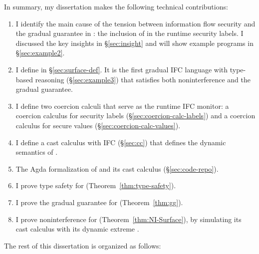 {\color{NavyBlue} %
In summary, my dissertation makes the following technical contributions:

\begin{enumerate}
\item I identify the main cause of the tension between information flow security
  and the gradual guarantee in \GSLRef: the inclusion of \unk in the runtime
  security labels. I discussed the key insights in \S\ref{sec:insight} and will
  show example programs in \S\ref{sec:example2}.
\item I define \Surface in \S\ref{sec:surface-def}. It is the first gradual IFC
  language with type-based reasoning (\S\ref{sec:example3}) that satisfies both
  noninterference and the gradual guarantee.
\item I define two coercion calculi that serve as the runtime IFC monitor: a
  coercion calculus for security labels (\S\ref{sec:coercion-calc-labels}) and a
  coercion calculus for secure values (\S\ref{sec:coercion-calc-values}).
\item I define a cast calculus \CC with IFC (\S\ref{sec:cc}) that defines the
  dynamic semantics of \Surface.
\item The Agda formalization of \Surface and its cast calculus \CC
  (\S\ref{sec:code-repo}).
\item I prove type safety for \Surface (Theorem~\ref{thm:type-safety}).
\item I prove the gradual guarantee for \Surface (Theorem~\ref{thm:gg}).
\item I prove noninterference for \Surface (Theorem~\ref{thm:NI-Surface}), by
  simulating its cast calculus \CC with its dynamic extreme \DynIFC.
\end{enumerate}

\clearpage

The rest of this dissertation is organized as follows:

}
